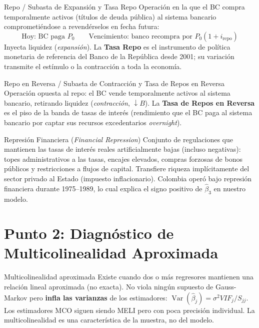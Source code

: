 \documentclass[12pt,a4paper]{article}
\newcommand\Var{\operatorname{Var}}
\begin{document}
\begin{defbox}{Repo / Subasta de Expansión y Tasa Repo}
Operación en la que el BC compra temporalmente activos (títulos de deuda pública)
al sistema bancario comprometiéndose a revendérselos en fecha futura:
\[\text{Hoy: BC paga }P_0\qquad\text{Vencimiento: banco recompra por }P_0(1+i_\text{repo})\]
Inyecta liquidez (\textit{expansión}). La \textbf{Tasa Repo} es el instrumento
de política monetaria de referencia del Banco de la República desde 2001;
su variación transmite el estímulo o la contracción a toda la economía.
\end{defbox}

\begin{defbox}{Repo en Reversa / Subasta de Contracción y Tasa de Repos en Reversa}
Operación opuesta al repo: el BC vende temporalmente activos al sistema bancario,
retirando liquidez (\textit{contracción}, $\downarrow B$). La
\textbf{Tasa de Repos en Reversa} es el piso de la banda de tasas de interés
(rendimiento que el BC paga al sistema bancario por captar sus recursos
excedentarios \textit{overnight}).
\end{defbox}

\begin{defbox}{Represión Financiera (\textit{Financial Repression})}
Conjunto de regulaciones que mantienen las tasas de interés reales artificialmente
bajas (incluso negativas): topes administrativos a las tasas, encajes elevados,
compras forzosas de bonos públicos y restricciones a flujos de capital. Transfiere
riqueza implícitamente del sector privado al Estado (impuesto inflacionario).
Colombia operó bajo represión financiera durante 1975--1989, lo cual explica el
signo positivo de $\hat\beta_3$ en nuestro modelo.
\end{defbox}

\section{Punto 2: Diagnóstico de Multicolinealidad Aproximada}

\begin{defbox}{Multicolinealidad aproximada}
Existe cuando dos o más regresores mantienen una relación lineal aproximada (no
exacta). No viola ningún supuesto de Gauss-Markov pero \textbf{infla las
varianzas} de los estimadores: $\Var(\hat\beta_j)=\sigma^2 VIF_j/S_{jj}$.
Los estimadores MCO siguen siendo MELI pero con poca precisión individual.
La multicolinealidad es una característica de la muestra, no del modelo.
\end{defbox}
\end{document}

